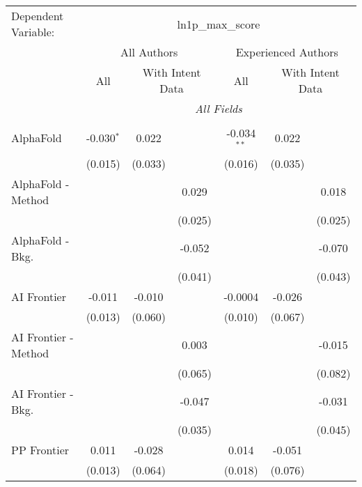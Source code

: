 \begingroup
\centering
\begin{tabular}{lcccccc}
   \tabularnewline \midrule \midrule
   Dependent Variable: & \multicolumn{6}{c}{ln1p\_max\_score}\\
 & \multicolumn{3}{c}{All Authors} & \multicolumn{3}{c}{Experienced Authors} \\
\cmidrule(lr){2-4} \cmidrule(lr){5-7}
 & \multicolumn{1}{c}{All} & \multicolumn{2}{c}{With Intent Data} & \multicolumn{1}{c}{All} & \multicolumn{2}{c}{With Intent Data} \\
\cmidrule(lr){2-2} \cmidrule(lr){3-4} \cmidrule(lr){5-5} \cmidrule(lr){6-7}
 & \multicolumn{6}{c}{\textit{All Fields}} \\ \\
   AlphaFold            & -0.030$^{*}$ & 0.022   &         & -0.034$^{**}$ & 0.022   &   \\   
                        & (0.015)      & (0.033) &         & (0.016)       & (0.035) &   \\   
   AlphaFold - Method   &              &         & 0.029   &               &         & 0.018\\   
                        &              &         & (0.025) &               &         & (0.025)\\   
   AlphaFold - Bkg.     &              &         & -0.052  &               &         & -0.070\\   
                        &              &         & (0.041) &               &         & (0.043)\\   
   AI Frontier          & -0.011       & -0.010  &         & -0.0004       & -0.026  &   \\   
                        & (0.013)      & (0.060) &         & (0.010)       & (0.067) &   \\   
   AI Frontier - Method &              &         & 0.003   &               &         & -0.015\\   
                        &              &         & (0.065) &               &         & (0.082)\\   
   AI Frontier - Bkg.   &              &         & -0.047  &               &         & -0.031\\   
                        &              &         & (0.035) &               &         & (0.045)\\   
   PP Frontier          & 0.011        & -0.028  &         & 0.014         & -0.051  &   \\   
                        & (0.013)      & (0.064) &         & (0.018)       & (0.076) &   \\   

\end{tabular}
